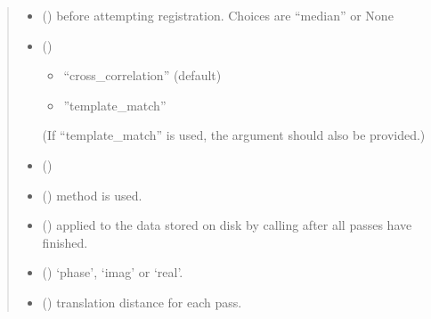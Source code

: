 \documentclass[letterpaper,10pt,english]{sphinxmanual}
\begin{document}
\begin{fulllineitems}
\begin{fulllineitems}
\begin{quote}
\begin{description}
\begin{itemize}
\item {} 
 () \textendash{} before attempting registration. Choices are “median” or None

\item {} 
 () \textendash{} \begin{itemize}
\item {} 
“cross\_correlation” (default)

\item {} 
”template\_match”

\end{itemize}

(If “template\_match” is used, the  argument should
also be provided.)


\item {} 
 () \textendash{} 

\item {} 
 () \textendash{}  method is used.

\item {} 
 (\sphinxstyleliteralemphasis{ (}\sphinxstyleliteralemphasis{)}\sphinxstyleliteralemphasis{, }) \textendash{} applied to the data stored on disk by calling
 after all passes have
finished.

\item {} 
 (\sphinxstyleliteralemphasis{,}) \textendash{} ‘phase’, ‘imag’ or ‘real’.

\item {} 
 (\sphinxstyleliteralemphasis{ (}\sphinxstyleliteralemphasis{)}\sphinxstyleliteralemphasis{, }) \textendash{} translation distance for each pass.


\end{itemize}
\end{description}
\end{quote}
\end{fulllineitems}
\end{fulllineitems}
\end{document}
